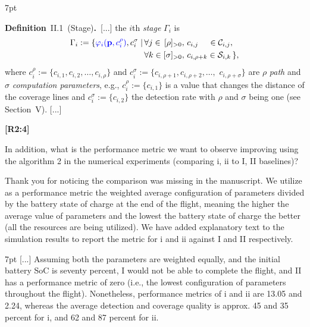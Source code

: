 \documentclass[10pt]{letter}
\newenvironment{formal}{%
  \def\FrameCommand{%
    \hspace{1pt}%
    {\color{red}\vrule width 2pt}%
    {\color{formalshade}\vrule width 4pt}%
    \colorbox{formalshade}%
  }%
  \MakeFramed{\advance\hsize-\width\FrameRestore}%
  \noindent\hspace{-4.55pt}%
  \begin{adjustwidth}{}{7pt}%
  \vspace{2pt}\vspace{2pt}%
}
{%
  \vspace{2pt}\end{adjustwidth}\endMakeFramed%
}
\begin{document}
{  \begin{formal}
    \color{black} 
    \textbf{Definition}~II.1~(Stage)\textbf{.}~[...] the $i$th \emph{stage} $\Gamma_i$ %
      is
    \begin{equation*}\begin{split}
        \Gamma_i:=\{{\color{blue}\varphi_i(\mathbf{p}%
        ,c_i^\rho)},c_i^\sigma\mid
        \,&\forall j\in\,[\rho]_{>0},\,c_{i,j}\,\,\,\,\,\,\,\in\mathcal{C}_{i,j},\,\\
          &\forall k\in[\sigma]_{>0},\,c_{i,\rho+k}\in\mathcal{S}_{i,k}\,\},
    \end{split}\end{equation*}
    where $c_i^\rho${\color{blue}$:=\{c_{i,1},c_{i,2},\dots,c_{i,\rho}\}$} and $c_i^\sigma${\color{blue}$:=\{c_{i,\rho+1},c_{i,\rho+2},\dots,$ $c_{i,\rho+\sigma}\}$} are $\rho$ \emph{path} and $\sigma$ \emph{computation parameters}{\color{blue}, e.g., $c_i^\rho:=\{c_{i,1}\}$ is a value that changes the distance of the coverage lines and $c^\sigma_i:=\{c_{i,2}\}$ the detection rate with $\rho$ and $\sigma$ being one (see Section~{\color{red}V})}. [...]
    \vspace*{1ex}
  \end{formal}



  }

  {\hspace*{-4.5em}\textbf{[R2:4]}\vspace*{-1.9em}}

  In addition, what is the performance metric we want to observe improving using the algorithm 2 in the numerical experiments (comparing i, ii to I, II baselines)? 
  
  {\color{blue} 
  
  {\hspace*{-4.5em}{[R2:4]}\vspace*{-1.9em}}

  Thank you for noticing the comparison was missing in the manuscript. We utilize as a performance metric the weighted average configuration of parameters divided by the battery state of charge at the end of the flight, meaning the higher the average value of parameters and the lowest the battery state of charge the better (all the resources are being utilized). We have added explanatory text to the simulation results to report the metric for i and ii against I and II respectively.

  \begin{formal}\color{black}[...] 
    {\color{blue}
Assuming both the parameters are weighted equally, and the initial battery SoC is seventy percent, {\color{red}I} would not be able to complete the flight, and {\color{red}II} has a performance metric of zero (i.e., the lowest configuration of parameters throughout the flight).
Nonetheless, performance metrics of {\color{red}i} and {\color{red}ii} are 13.05 and 2.24, whereas the average detection and coverage quality is approx. 45 and 35 percent for {\color{red}i}, and 62 and 87 percent for {\color{red}ii}.}  
    \vspace*{1ex}
  \end{formal}
  }
\end{document}
